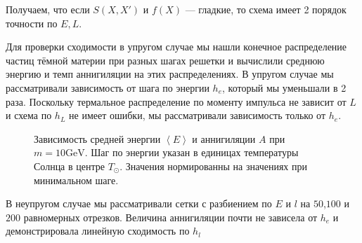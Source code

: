 \documentclass[a4paper, 14pt]{article}
\newcommand{\avarage}[1]{\left\langle #1 \right\rangle}
\begin{document}
Получаем, что если $S(X,X')$ и $f(X)$ --- гладкие, то схема имеет 2 порядок точности по $E,L$.



Для проверки сходимости в упругом случае мы нашли конечное распределение частиц тёмной материи при разных шагах решетки и вычислили среднюю энергию и темп аннигиляции на этих распределениях. В упругом случае мы рассматривали зависимость от шага по энергии $h_e$, который мы уменьшали в 2 раза. Поскольку термальное распределение по моменту импульса не зависит от $L$ и схема по $h_L$ не имеет ошибки, мы рассматривали зависимость только от $h_e$. 



\begin{figure}[!h]
	\centering
	\caption{Зависимость средней энергии $\avarage{E}$ и аннигиляции $A$ при $m = 10 \text{GeV}$. Шаг по энергии указан в единицах температуры Солнца в центре $T_{\odot}$. Значения нормированны на значениях при минимальном шаге.}
	\label{plot:ConvEl10}
\end{figure}

В неупругом случае мы рассматривали сетки с разбиением по $E$ и $l$ на $50$,$100$ и $200$ равномерных отрезков.
Величина аннигиляции почти не зависела от $h_e$ и демонстрировала линейную сходимость по $h_l$
\end{document}
